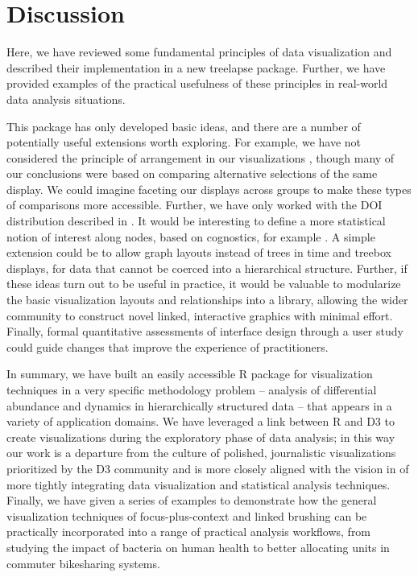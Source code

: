 \section{Discussion}
\label{conclusion}

Here, we have reviewed some fundamental principles of data visualization and
described their implementation in a new treelapse package. Further, we have
provided examples of the practical usefulness of these principles in real-world
data analysis situations.

This package has only developed basic ideas, and there are a number of
potentially useful extensions worth exploring. For example, we have not
considered the principle of arrangement in our visualizations
\citep{buja1996interactive}, though many of our conclusions were based on
comparing alternative selections of the same display. We could imagine faceting
our displays across groups to make these types of comparisons more accessible.
Further, we have only worked with the DOI distribution described in
\citep{heer2004doitrees}. It would be interesting to define a more statistical
notion of interest along nodes, based on cognostics, for example
\citep{hafen2013trelliscope, friedman2002john}. A simple extension could be to
allow graph layouts instead of trees in time and treebox displays, for data that
cannot be coerced into a hierarchical structure. Further, if these ideas turn
out to be useful in practice, it would be valuable to modularize the basic
visualization layouts and relationships into a library, allowing the wider
community to construct novel linked, interactive graphics with minimal effort.
Finally, formal quantitative assessments of interface design through a user
study could guide changes that improve the experience of practitioners.

In summary, we have built an easily accessible R package for visualization
techniques in a very specific methodology problem -- analysis of differential
abundance and dynamics in hierarchically structured data -- that appears in a
variety of application domains. We have leveraged a link between R and D3
\citep{vaidyanathan2014htmlwidgets} to create visualizations during the
exploratory phase of data analysis; in this way our work is a departure from the
culture of polished, journalistic visualizations prioritized by the D3 community
and is more closely aligned with the vision in \citep{de2003visual} of more
tightly integrating data visualization and statistical analysis techniques.
Finally, we have given a series of examples to demonstrate how the general
visualization techniques of focus-plus-context and linked brushing can be
practically incorporated into a range of practical analysis workflows, from
studying the impact of bacteria on human health to better allocating units in
commuter bikesharing systems.
